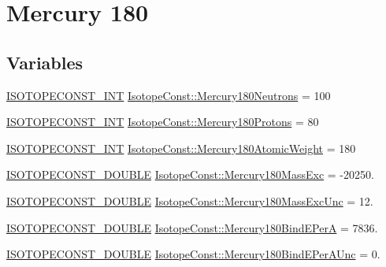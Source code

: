 \hypertarget{group___isotope_const-_mercury-_hg180}{}\section{Mercury 180}
\label{group___isotope_const-_mercury-_hg180}
\subsection*{Variables}
\begin{DoxyCompactItemize}
\item 
\mbox{\hyperlink{group___isotope_const-_macros_ga5f18360b3e99483a35c32d789e62621c}{I\+S\+O\+T\+O\+P\+E\+C\+O\+N\+S\+T\+\_\+\+I\+NT}} \mbox{\hyperlink{group___isotope_const-_mercury-_hg180_ga3f1988cc0e0bbae6a6547c2cab7c669e}{Isotope\+Const\+::\+Mercury180\+Neutrons}} = 100
\item 
\mbox{\hyperlink{group___isotope_const-_macros_ga5f18360b3e99483a35c32d789e62621c}{I\+S\+O\+T\+O\+P\+E\+C\+O\+N\+S\+T\+\_\+\+I\+NT}} \mbox{\hyperlink{group___isotope_const-_mercury-_hg180_ga64c714ad1b9568511723c1d8d5888b5b}{Isotope\+Const\+::\+Mercury180\+Protons}} = 80
\item 
\mbox{\hyperlink{group___isotope_const-_macros_ga5f18360b3e99483a35c32d789e62621c}{I\+S\+O\+T\+O\+P\+E\+C\+O\+N\+S\+T\+\_\+\+I\+NT}} \mbox{\hyperlink{group___isotope_const-_mercury-_hg180_gaed14fb2f112e8ce7109ca82c2150521d}{Isotope\+Const\+::\+Mercury180\+Atomic\+Weight}} = 180
\item 
\mbox{\hyperlink{group___isotope_const-_macros_ga8f45a7272ce02c0b4c65c44636ed719a}{I\+S\+O\+T\+O\+P\+E\+C\+O\+N\+S\+T\+\_\+\+D\+O\+U\+B\+LE}} \mbox{\hyperlink{group___isotope_const-_mercury-_hg180_ga0db6e8e10562fa8b8eefc3d3bb10924d}{Isotope\+Const\+::\+Mercury180\+Mass\+Exc}} = -\/20250.
\item 
\mbox{\hyperlink{group___isotope_const-_macros_ga8f45a7272ce02c0b4c65c44636ed719a}{I\+S\+O\+T\+O\+P\+E\+C\+O\+N\+S\+T\+\_\+\+D\+O\+U\+B\+LE}} \mbox{\hyperlink{group___isotope_const-_mercury-_hg180_gac1ebb526c10f005dbccf1abed510f6bf}{Isotope\+Const\+::\+Mercury180\+Mass\+Exc\+Unc}} = 12.
\item 
\mbox{\hyperlink{group___isotope_const-_macros_ga8f45a7272ce02c0b4c65c44636ed719a}{I\+S\+O\+T\+O\+P\+E\+C\+O\+N\+S\+T\+\_\+\+D\+O\+U\+B\+LE}} \mbox{\hyperlink{group___isotope_const-_mercury-_hg180_ga0467f63722fbd0bb6f6adb87f97e7c34}{Isotope\+Const\+::\+Mercury180\+Bind\+E\+PerA}} = 7836.
\item 
\mbox{\hyperlink{group___isotope_const-_macros_ga8f45a7272ce02c0b4c65c44636ed719a}{I\+S\+O\+T\+O\+P\+E\+C\+O\+N\+S\+T\+\_\+\+D\+O\+U\+B\+LE}} \mbox{\hyperlink{group___isotope_const-_mercury-_hg180_ga8a80fb5ec1ae3108299640d3dacb8f34}{Isotope\+Const\+::\+Mercury180\+Bind\+E\+Per\+A\+Unc}} = 0.

\end{DoxyCompactItemize}
